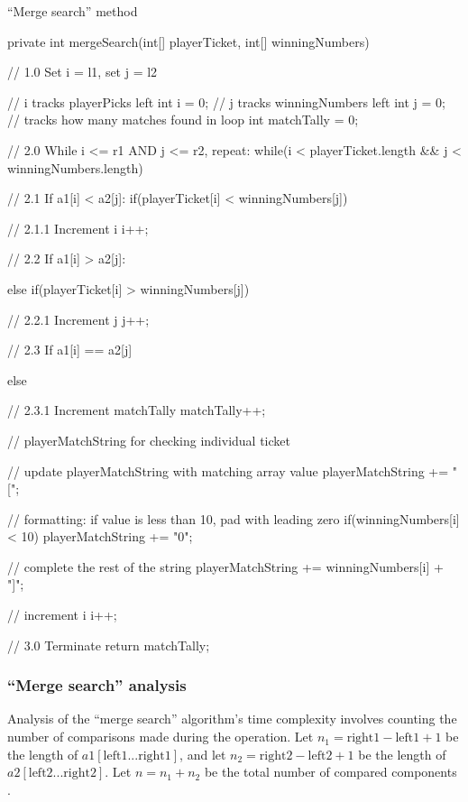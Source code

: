 \begin{listing}[H]
\caption{``Merge search'' method}
\begin{javacode}
private int mergeSearch(int[] playerTicket, int[] winningNumbers) {

    // 1.0 Set i = l1, set j = l2

    // i tracks playerPicks left
    int i = 0;
    // j tracks winningNumbers left
    int j = 0;
    // tracks how many matches found in loop
    int matchTally = 0;

    //  2.0 While i <= r1 AND j <= r2, repeat:
    while(i < playerTicket.length && j < winningNumbers.length) {

        // 2.1 If a1[i] < a2[j]:
        if(playerTicket[i] < winningNumbers[j]) {

            // 2.1.1 Increment i
            i++;

        // 2.2 If a1[i] > a2[j]:
        } else if(playerTicket[i] > winningNumbers[j]) {

            // 2.2.1 Increment j
            j++;

        // 2.3 If a1[i] == a2[j]
        } else {

            // 2.3.1 Increment matchTally
            matchTally++;

            // playerMatchString for checking individual ticket

            // update playerMatchString with matching array value
            playerMatchString += "[";

            // formatting: if value is less than 10, pad with leading zero
            if(winningNumbers[i] < 10) {
                playerMatchString += "0";
            }

            // complete the rest of the string
            playerMatchString += winningNumbers[i] + "]";

            // increment i
            i++;
        }
    }

    // 3.0 Terminate
    return matchTally;
}
\end{javacode}
\end{listing}

\newpage
\subsubsection{``Merge search'' analysis}

Analysis of the ``merge search'' algorithm's time complexity involves counting the number of comparisons made during the operation. Let $n_1 = \mbox{right}1 - \mbox{left}1 + 1$ be the length of $a1[\mbox{left}1...\mbox{right}1]$, and let $n_2 = \mbox{right}2 - \mbox{left}2 + 1$ be the length of $a2[\mbox{left}2...\mbox{right}2]$. Let $n = n_1 + n_2$ be the total number of compared components \citep[p. 48]{Watt2001}.

